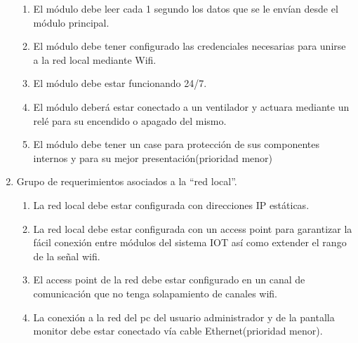 \documentclass[11pt]{charter}
\begin{document}
\begin{enumerate}
\begin{enumerate}
	\item El módulo debe leer cada 1 segundo los datos que se le envían desde el módulo principal.
	\item El módulo debe tener configurado las credenciales necesarias para unirse a la red local mediante Wifi.
	\item El módulo debe estar funcionando 24/7.
	\item El módulo deberá estar conectado a un ventilador y actuara mediante un relé para su encendido o apagado del mismo.
	\item El módulo debe tener un case para protección de sus componentes internos y para su mejor presentación(prioridad menor)
	\end{enumerate}

\item Grupo de requerimientos asociados a la ``red local''.
	\begin{enumerate}
	\item La red local debe estar configurada con direcciones IP estáticas.
	\item La red local debe estar configurada con un access point para garantizar la fácil conexión entre módulos del sistema IOT así como extender el rango de la señal wifi.
	\item El access point de la red debe estar configurado en un canal de comunicación que no tenga solapamiento de canales wifi.
	\item La conexión a la red del pc del usuario administrador y de la pantalla monitor debe estar conectado vía cable Ethernet(prioridad menor).
	\end{enumerate}

\end{enumerate}
\end{document}
